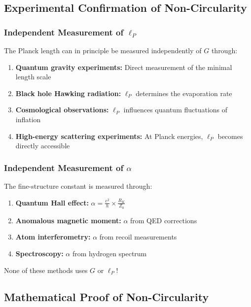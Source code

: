 	\subsection{Experimental Confirmation of Non-Circularity}
	
	\subsubsection{Independent Measurement of $\ell_P$}
	
	The Planck length can in principle be measured independently of $G$ through:
	
	\begin{enumerate}
		\item \textbf{Quantum gravity experiments:} Direct measurement of the minimal length scale
		\item \textbf{Black hole Hawking radiation:} $\ell_P$ determines the evaporation rate
		\item \textbf{Cosmological observations:} $\ell_P$ influences quantum fluctuations of inflation
		\item \textbf{High-energy scattering experiments:} At Planck energies, $\ell_P$ becomes directly accessible
	\end{enumerate}
	
	\subsubsection{Independent Measurement of $\alpha$}
	
	The fine-structure constant is measured through:
	
	\begin{enumerate}
		\item \textbf{Quantum Hall effect:} $\alpha = \frac{e^2}{h} \times \frac{R_K}{Z_0}$
		\item \textbf{Anomalous magnetic moment:} $\alpha$ from QED corrections
		\item \textbf{Atom interferometry:} $\alpha$ from recoil measurements
		\item \textbf{Spectroscopy:} $\alpha$ from hydrogen spectrum
	\end{enumerate}
	
	None of these methods uses $G$ or $\ell_P$!
	
	\subsection{Mathematical Proof of Non-Circularity}
	
